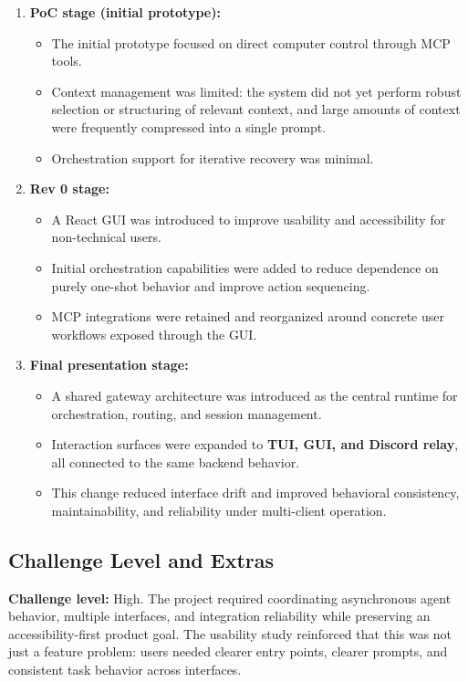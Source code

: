 \documentclass{article}
\begin{document}
\begin{enumerate}
	\item \textbf{PoC stage (initial prototype):}
	\begin{itemize}
		\item The initial prototype focused on direct computer control through MCP
		tools.
		\item Context management was limited: the system did not yet perform robust
		selection or structuring of relevant context, and large amounts of context
		were frequently compressed into a single prompt.
		\item Orchestration support for iterative recovery was minimal.
	\end{itemize}

	\item \textbf{Rev 0 stage:}
	\begin{itemize}
		\item A React GUI was introduced to improve usability and accessibility for
		non-technical users.
		\item Initial orchestration capabilities were added to reduce dependence on
		purely one-shot behavior and improve action sequencing.
		\item MCP integrations were retained and reorganized around concrete user
		workflows exposed through the GUI.
	\end{itemize}

	\item \textbf{Final presentation stage:}
	\begin{itemize}
		\item A shared gateway architecture was introduced as the central runtime for
		orchestration, routing, and session management.
		\item Interaction surfaces were expanded to \textbf{TUI, GUI, and Discord relay},
		all connected to the same backend behavior.
		\item This change reduced interface drift and improved behavioral
		consistency, maintainability, and reliability under multi-client operation.
	\end{itemize}
\end{enumerate}

\subsection{Challenge Level and Extras}

\textbf{Challenge level:} High. The project required coordinating asynchronous
agent behavior, multiple interfaces, and integration reliability while preserving
an accessibility-first product goal. The usability study reinforced that this was
not just a feature problem: users needed clearer entry points, clearer prompts,
and consistent task behavior across interfaces.
\end{document}
